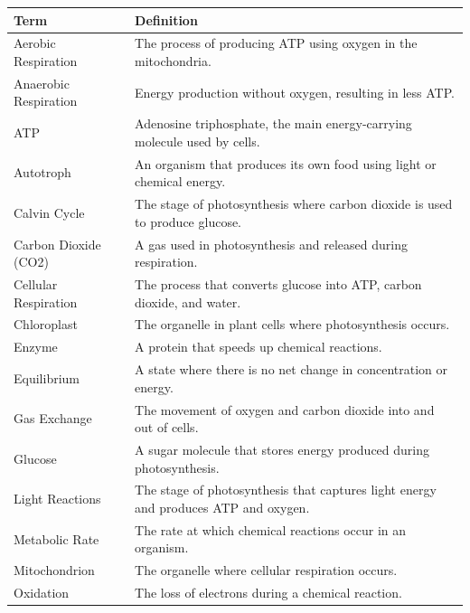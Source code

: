 \documentclass[
  letterpaper,
  DIV=11,
  numbers=noendperiod]{scrreprt}
\newcounter{none} %
\begin{document}
{\def\LTcaptype{none} %
\begin{longtable}[]{@{}
  >{\raggedright\arraybackslash}p{}
  >{\raggedright\arraybackslash}p{}@{}}
\toprule\noalign{}
\begin{minipage}[b]{\linewidth}\raggedright
\textbf{Term}
\end{minipage} & \begin{minipage}[b]{\linewidth}\raggedright
\textbf{Definition}
\end{minipage} \\
\midrule\noalign{}
\endhead
\bottomrule\noalign{}
\endlastfoot
Aerobic Respiration & The process of producing ATP using oxygen in the
mitochondria. \\
Anaerobic Respiration & Energy production without oxygen, resulting in
less ATP. \\
ATP & Adenosine triphosphate, the main energy-carrying molecule used by
cells. \\
Autotroph & An organism that produces its own food using light or
chemical energy. \\
Calvin Cycle & The stage of photosynthesis where carbon dioxide is used
to produce glucose. \\
Carbon Dioxide (CO2) & A gas used in photosynthesis and released during
respiration. \\
Cellular Respiration & The process that converts glucose into ATP,
carbon dioxide, and water. \\
Chloroplast & The organelle in plant cells where photosynthesis
occurs. \\
Enzyme & A protein that speeds up chemical reactions. \\
Equilibrium & A state where there is no net change in concentration or
energy. \\
Gas Exchange & The movement of oxygen and carbon dioxide into and out of
cells. \\
Glucose & A sugar molecule that stores energy produced during
photosynthesis. \\
Light Reactions & The stage of photosynthesis that captures light energy
and produces ATP and oxygen. \\
Metabolic Rate & The rate at which chemical reactions occur in an
organism. \\
Mitochondrion & The organelle where cellular respiration occurs. \\
Oxidation & The loss of electrons during a chemical reaction. \\

\end{longtable}}
\end{document}
